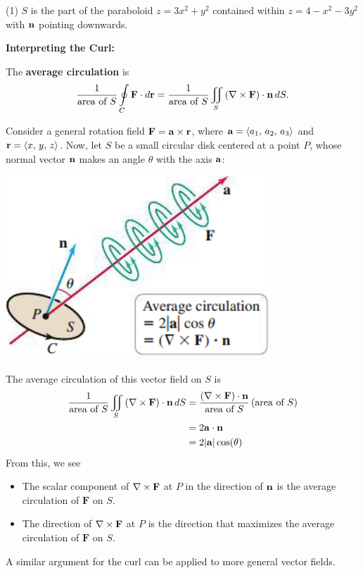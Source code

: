 \documentclass[mathNotesPreamble]{subfiles}
\begin{document}
  \begin{tasks}[after-item-skip=\stretch{1}, label=\textbullet, item-indent=0pt, resume](1)
    \task $S$ is the part of the paraboloid $z=3x^2+y^2$ contained within $z=4-x^2-3y^2$ with ${\mathbf{n}}$ pointing downwards.
  \end{tasks}
  \pagebreak

  \textbf{Interpreting the Curl:}

  The \textbf{average circulation} is 
    \[\frac{1}{\textnormal{area of }S}\oint\limits_C \mathbf F\cdot d{\mathbf{r}}=\frac{1}{\textnormal{area of }S}\iint\limits_S {\left(\nabla\times\mathbf F\right)}\cdot{\mathbf{n}}\,dS.\]

  Consider a general rotation field $\mathbf F={\mathbf{a}}\times{\mathbf{r}}$, where ${\mathbf{a}}={\left\langle a_1,\,a_2,\,a_3 \right\rangle}$ and ${\mathbf{r}}={\left\langle x,\,y,\,z \right\rangle}$. Now, let $S$ be a small circular disk centered at a point $P$, whose normal vector ${\mathbf{n}}$ makes an angle $\theta$ with the axis ${\mathbf{a}}$:
  \begin{center}
    \includegraphics[width=0.4\linewidth]{images/briggs_17_07/fig17_64}
  \end{center}
  The average circulation of this vector field on $S$ is
  \begin{align*}
    \frac{1}{\textnormal{area of }S} \iint\limits_S {\left(\nabla\times\mathbf F\right)}\cdot{\mathbf{n}}\,dS
      &=\frac{{\left(\nabla\times\mathbf F\right)}\cdot{\mathbf{n}}}{\textnormal{area of }S} \,{\left(\textnormal{area of }S\right)}\\
      &=2{\mathbf{a}}\cdot{\mathbf{n}}\\
      &=2{\left\vert{\mathbf{a}}\right\vert}\cos(\theta)
  \end{align*}
  From this, we see
  \begin{itemize}
    \item The scalar component of $\nabla\times\mathbf F$ at $P$ in the direction of ${\mathbf{n}}$ is the average circulation of $\mathbf F$ on $S$.
    \item The direction of $\nabla\times\mathbf F$ at $P$ is the direction that maximizes the average circulation of $\mathbf F$ on $S$.
  \end{itemize}
  A similar argument for the curl can be applied to more general vector fields.
  \pagebreak
\end{document}
